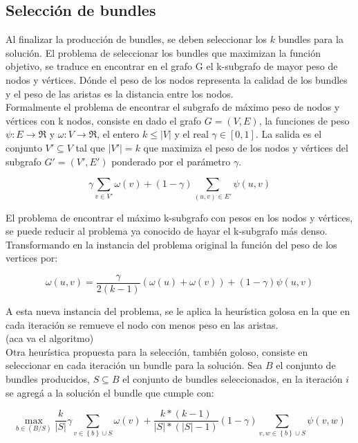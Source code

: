 \subsection{Selección de bundles}
Al finalizar la producción de bundles, se deben seleccionar los $k$ bundles para la solución. El problema de seleccionar los bundles que maximizan la función objetivo, se traduce en encontrar en el grafo G el k-subgrafo de mayor peso de nodos y vértices. Dónde el peso de los nodos representa la calidad de los bundles y el peso de las aristas es la distancia entre los nodos.\\
Formalmente el problema de encontrar el subgrafo de máximo peso de nodos y vértices con k nodos, consiste en dado el grafo $ G = (V,E) $, la funciones de peso $\psi : E \rightarrow \Re$ y $\omega : V \rightarrow \Re$, el entero $ k \leq |V| $ y el real $\gamma \in [0,1]$. La salida es el conjunto $V' \subseteq V$ tal que $|V'| = k$ que maximiza el peso de los nodos y vértices del subgrafo $G' = (V', E')$ ponderado por el parámetro $\gamma$.

\begin{equation}
\gamma \sum_{v \in V'}{\omega(v)} + (1 - \gamma) \sum_{(u,v) \in E'}{\psi(u,v)}
\end{equation}

El problema de encontrar el máximo k-subgrafo con pesos en los nodos y vértices, se puede reducir al problema ya conocido de hayar el k-subgrafo más denso\cite{SubgraphProblem}. Transformando en la instancia del problema original la función del peso de los vertices por:
 
\begin{equation}
\omega(u,v) = \dfrac{\gamma}{2( k - 1)} (\omega(u) + \omega(v)) + (1 - \gamma)\psi(u,v) 
\end{equation}

A esta nueva instancia del problema, se le aplica la heurística golosa en la que en cada iteración se remueve el nodo con menos peso en las aristas.\\

(aca va el algoritmo)\\

Otra heurística propuesta para la selección, también goloso, consiste en seleccionar en cada iteración un bundle para la solución. Sea $B$ el conjunto de bundles producidos, $S \subseteq B$ el conjunto de bundles seleccionados, en la iteración $i$ se agregá a la solución el bundle que cumple con:

\begin{equation}
\max_{b \in (B/S)}{\dfrac{k}{|S|}} \gamma \sum_{v \in \left\{b\right\} \cup S}{\omega(v)} + \dfrac{k * (k-1)}{|S| * (|S|-1)} (1-\gamma) \sum_{v,w \in \left\{b\right\} \cup S}{\psi(v,w)}
\end{equation}

